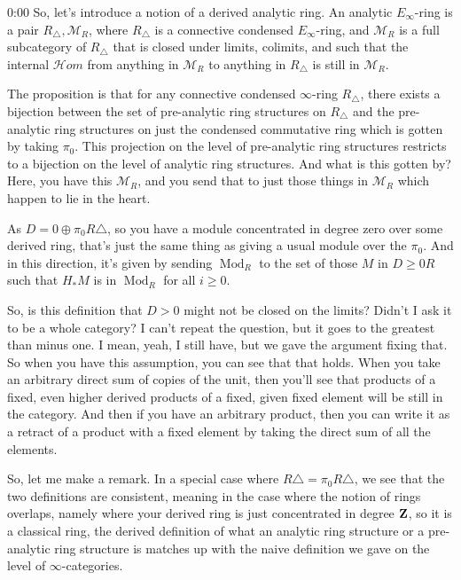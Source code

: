 \begin{unfinished}{0:00}
So, let's introduce a notion of a derived analytic ring. An analytic $E_\infty$-ring is a pair $R_\triangle, \mathcal{M}_R$, where $R_\triangle$ is a connective condensed $E_\infty$-ring, and $\mathcal{M}_R$ is a full subcategory of $R_\triangle$ that is closed under limits, colimits, and such that the internal $\mathcal{H}om$ from anything in $\mathcal{M}_R$ to anything in $R_\triangle$ is still in $\mathcal{M}_R$.

The proposition is that for any connective condensed $\infty$-ring $R_\triangle$, there exists a bijection between the set of pre-analytic ring structures on $R_\triangle$ and the pre-analytic ring structures on just the condensed commutative ring which is gotten by taking $\pi_0$. This projection on the level of pre-analytic ring structures restricts to a bijection on the level of analytic ring structures. And what is this gotten by? Here, you have this $\mathcal{M}_R$, and you send that to just those things in $\mathcal{M}_R$ which happen to lie in the heart.

As $D = 0 \oplus \pi_0 R \triangle$, so you have a module concentrated in degree zero over some derived ring, that's just the same thing as giving a usual module over the $\pi_0$. And in this direction, it's given by sending $\operatorname{Mod}_R$ to the set of those $M$ in $D \geq 0 R$ such that $H_* M$ is in $\operatorname{Mod}_R$ for all $i \geq 0$. 

So, is this definition that $D > 0$ might not be closed on the limits? Didn't I ask it to be a whole category? I can't repeat the question, but it goes to the greatest than minus one. I mean, yeah, I still have, but we gave the argument fixing that. So when you have this assumption, you can see that that holds. When you take an arbitrary direct sum of copies of the unit, then you'll see that products of a fixed, even higher derived products of a fixed, given fixed element will be still in the category. And then if you have an arbitrary product, then you can write it as a retract of a product with a fixed element by taking the direct sum of all the elements.

So, let me make a remark. In a special case where $R \triangle = \pi_0 R \triangle$, we see that the two definitions are consistent, meaning in the case where the notion of rings overlaps, namely where your derived ring is just concentrated in degree $\mathbf Z$, so it is a classical ring, the derived definition of what an analytic ring structure or a pre-analytic ring structure is matches up with the naive definition we gave on the level of $\infty$-categories.


\end{unfinished}
